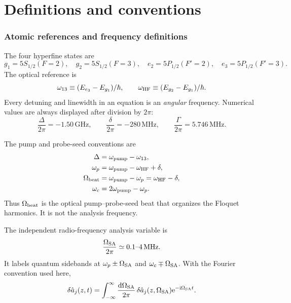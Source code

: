 \documentclass[11pt,a4paper]{article}
\newcommand{\dd}{\mathrm d}
\newcommand{\ii}{\mathrm i}
\newcommand{\e}{\mathrm e}
\newcommand{\GHz}{\,\mathrm{GHz}}
\newcommand{\MHz}{\,\mathrm{MHz}}
\begin{document}
\tableofcontents
\clearpage

\part{Definitions and conventions}

\section{Atomic references and frequency definitions}

The four hyperfine states are
\[
g_1=5S_{1/2}(F=2),\quad g_2=5S_{1/2}(F=3),\quad
e_2=5P_{1/2}(F'=2),\quad e_3=5P_{1/2}(F'=3).
\]
The optical reference is
\[
\omega_{13}\equiv(E_{e_3}-E_{g_1})/\hbar,\qquad
\omega_{\rm HF}\equiv(E_{g_2}-E_{g_1})/\hbar .
\]
Every detuning and linewidth in an equation is an \emph{angular} frequency.
Numerical values are always displayed after division by $2\pi$:
\[
\frac{\Delta}{2\pi}=-1.50\GHz,\qquad
\frac{\delta}{2\pi}=-280\MHz,\qquad
\frac{\Gamma}{2\pi}=5.746\MHz .
\]

The pump and probe-seed conventions are
\begin{align}
\Delta&=\omega_{\rm pump}-\omega_{13},\\
\omega_p&=\omega_{\rm pump}-\omega_{\rm HF}+\delta,\\
\Omega_{\rm beat}&=\omega_{\rm pump}-\omega_p=\omega_{\rm HF}-\delta,\\
\omega_c&=2\omega_{\rm pump}-\omega_p .
\label{eq:frequency-definitions}
\end{align}
Thus $\Omega_{\rm beat}$ is the optical pump--probe-seed beat that organizes the
Floquet harmonics. It is not the analysis frequency.

The independent radio-frequency analysis variable is
\[
\frac{\Omega_{\rm SA}}{2\pi}\simeq0.1\text{--}4\MHz .
\]
It labels quantum sidebands at $\omega_p\pm\Omega_{\rm SA}$ and
$\omega_c\mp\Omega_{\rm SA}$. With the Fourier convention used here,
\begin{equation}
\delta\hat a_j(z,t)=
\int_{-\infty}^{\infty}\frac{\dd\Omega_{\rm SA}}{2\pi}\,
\delta\hat a_j(z,\Omega_{\rm SA})\e^{-\ii\Omega_{\rm SA}t}.
\label{eq:fourier}
\end{equation}
\end{document}
